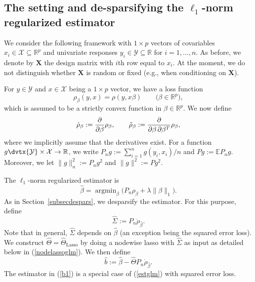 \documentclass[aos,MSNbibl,dvips]{arximspdf}
\def\cal{\mathcal}
\newcommand{\EE}{\mathbb{E}}
\newcommand{\R}{\mathbb{R}}
\newcommand{\bx}{\mathbf{X}}
\newcommand{\argmin}{\mathop{\arg\min}}
\begin{document}
\subsection{The setting and de-sparsifying the \texorpdfstring{$\ell_1$-norm}{l1-norm} regularized
estimator}\label{desparseGLMsection}

We consider the following framework with $1 \times p$ vectors of
covariables $x_i \in{\cal X}
\subseteq\R^p$ and univariate responses $y_i \in{\cal Y} \subseteq
\R$ for $i=1,\ldots,n$. As before, we denote by $\bx$ the design matrix
with $i$th row equal to $x_i$. At the moment, we do not distinguish
whether $\bx$ is random or fixed (e.g., when conditioning on $\bx$).

For $y \in{\cal Y}$ and
$x \in{\cal X}$ being a $1 \times p$ vector, we have a loss function
%
\[
\rho_{\beta} (y,x)= \rho(y, x \beta) \qquad\bigl(\beta\in\R^p
\bigr),
\]
%
which is assumed to be a strictly convex function in $\beta\in\R^p$.
We now define
%
\[
\dot\rho_{\beta}:= {\partial\over\partial\beta} \rho_{\beta}, \qquad\ddot
\rho_{\beta}:= {\partial\over\partial\beta\,\partial\beta^T } \rho_{\beta},
\]
%
where we implicitly assume that the derivatives exist.
For a function $g\dvtx {\cal Y} \times{\cal X} \to\R$,
we write\vspace*{1.5pt}
$P_n g:= \sum_{i=1}^n g(y_i,x_i) / n $ and $Pg:= \EE P_n g $.
Moreover, we let $\| g \|_n^2:= P_n g^2 $ and $\| g \|^2:= P g^2 $.

The $\ell_1$-norm regularized estimator is
%
\begin{equation}
\label{lasso-genrho} \hat{\beta} = \argmin_{\beta} \bigl(P_n
\rho_{\beta} + \lambda\| \beta\|_1\bigr).
\end{equation}
%
As in Section~\ref{subsecdespars}, we desparsify the estimator. For this
purpose, define
%
\begin{equation}
\label{hatSigmaglm} \hat\Sigma:= P_n \ddot\rho_{\hat\beta}.
\end{equation}
%
Note that in general, $\hat{\Sigma}$ depends on $\hat{\beta}$ (an exception
being the squared error loss). We construct $\hat\Theta=
\hat{\Theta}_{\mathrm{Lasso}}$ by doing a nodewise lasso with $\hat
\Sigma$
as input as detailed below in (\ref{nodelassoglm}).
We then define
%
\begin{equation}
\label{estglm} \hat{b}:= \hat\beta- \hat\Theta P_n \dot
\rho_{\hat\beta}.
\end{equation}
%
The estimator in (\ref{b1}) is a special case of (\ref{estglm}) with
squared error loss.
\end{document}
